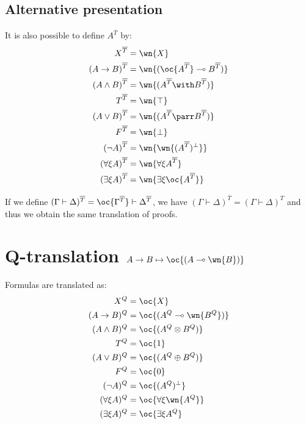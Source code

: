 \subsection{Alternative presentation}\label{alternative-presentation}

It is also possible to define \(A^{\overline{T}}\) by:
\begin{align*}
X^{\overline{T}} & = \wn{X} \\
(A\imp B)^{\overline{T}} & = \wn{(\oc{A^{\overline{T}}}\limp B^{\overline{T}})} \\
(A\wedge B)^{\overline{T}} & = \wn{(A^{\overline{T}} \with B^{\overline{T}})} \\
T^{\overline{T}} & = \wn{\top} \\
(A\vee B)^{\overline{T}} & = \wn{(A^{\overline{T}}\parr B^{\overline{T}})} \\
F^{\overline{T}} & = \wn{\bot} \\
(\neg A)^{\overline{T}} & = \wn{\wn{(A^{\overline{T}})\orth}} \\
(\forall\xi A)^{\overline{T}} & = \wn{\forall\xi A^{\overline{T}}} \\
(\exists\xi A)^{\overline{T}} & = \wn{\exists\xi \oc{A^{\overline{T}}}}
\end{align*}

If we define
\((\Gamma\vdash\Delta)^{\overline{T}} = \oc{\Gamma^{\overline{T}}}\vdash \Delta^{\overline{T}}\),
we have \((\Gamma\vdash\Delta)^{\overline{T}} = (\Gamma\vdash\Delta)^T\)
and thus we obtain the same translation of proofs.

\section{\texorpdfstring{Q-translation \(A\imp B \mapsto \oc{(A\limp\wn{B})}\)}{Q-translation A\textbackslash{}imp B \textbackslash{}mapsto \textbackslash{}oc\{(A\textbackslash{}limp\textbackslash{}wn\{B\})\}}}\label{q-translation-aimp-b-mapsto-ocalimpwnb}

Formulas are translated as:
\begin{align*}
X^Q & = \oc{X} \\
(A\imp B)^Q & = \oc{(A^Q\limp\wn{B^Q})} \\
(A\wedge B)^Q & = \oc{(A^Q \tens B^Q)} \\
T^Q & = \oc{\one} \\
(A\vee B)^Q & = \oc{(A^Q\plus B^Q)} \\
F^Q & = \oc{\zero} \\
(\neg A)^Q & = \oc{(A^Q)\orth} \\
(\forall\xi A)^Q & = \oc{\forall\xi \wn{A^Q}} \\
(\exists\xi A)^Q & = \oc{\exists\xi A^Q}
\end{align*}

